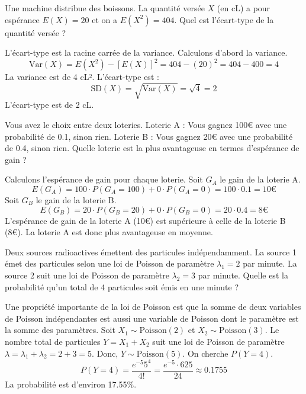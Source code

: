 \begin{exercicebox}
Une machine distribue des boissons. La quantité versée $X$ (en cL) a pour espérance $E(X)=20$ et on a $E(X^2)=404$. Quel est l'écart-type de la quantité versée ?
\end{exercicebox}

\begin{correctionbox}
L'écart-type est la racine carrée de la variance. Calculons d'abord la variance.
$$ \text{Var}(X) = E(X^2) - [E(X)]^2 = 404 - (20)^2 = 404 - 400 = 4 $$
La variance est de 4 cL².
L'écart-type est :
$$ \text{SD}(X) = \sqrt{\text{Var}(X)} = \sqrt{4} = 2 $$
L'écart-type est de 2 cL.
\end{correctionbox}

\begin{exercicebox}
Vous avez le choix entre deux loteries.
Loterie A : Vous gagnez 100€ avec une probabilité de 0.1, sinon rien.
Loterie B : Vous gagnez 20€ avec une probabilité de 0.4, sinon rien.
Quelle loterie est la plus avantageuse en termes d'espérance de gain ?
\end{exercicebox}

\begin{correctionbox}
Calculons l'espérance de gain pour chaque loterie.
Soit $G_A$ le gain de la loterie A.
$$ E(G_A) = 100 \cdot P(G_A=100) + 0 \cdot P(G_A=0) = 100 \cdot 0.1 = 10€ $$
Soit $G_B$ le gain de la loterie B.
$$ E(G_B) = 20 \cdot P(G_B=20) + 0 \cdot P(G_B=0) = 20 \cdot 0.4 = 8€ $$
L'espérance de gain de la loterie A (10€) est supérieure à celle de la loterie B (8€). La loterie A est donc plus avantageuse en moyenne.
\end{correctionbox}

\begin{exercicebox}
Deux sources radioactives émettent des particules indépendamment. La source 1 émet des particules selon une loi de Poisson de paramètre $\lambda_1=2$ par minute. La source 2 suit une loi de Poisson de paramètre $\lambda_2=3$ par minute. Quelle est la probabilité qu'un total de 4 particules soit émis en une minute ?
\end{exercicebox}

\begin{correctionbox}
Une propriété importante de la loi de Poisson est que la somme de deux variables de Poisson indépendantes est aussi une variable de Poisson dont le paramètre est la somme des paramètres.
Soit $X_1 \sim \text{Poisson}(2)$ et $X_2 \sim \text{Poisson}(3)$.
Le nombre total de particules $Y = X_1 + X_2$ suit une loi de Poisson de paramètre $\lambda = \lambda_1 + \lambda_2 = 2+3=5$.
Donc, $Y \sim \text{Poisson}(5)$.
On cherche $P(Y=4)$.
$$ P(Y=4) = \frac{e^{-5} 5^4}{4!} = \frac{e^{-5} \cdot 625}{24} \approx 0.1755 $$
La probabilité est d'environ 17.55\%.
\end{correctionbox}

